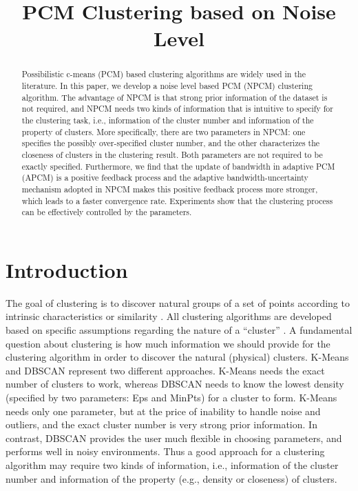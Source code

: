 \documentclass[conference]{IEEEtran}
\date{}
\title{PCM Clustering based on Noise Level}
\theoremstyle{definition}
\begin{document}
\author{
%
}
\maketitle
\begin{abstract}
Possibilistic c-means (PCM) based clustering algorithms are widely used in the literature. In this paper, we develop a noise level based PCM (NPCM) clustering algorithm.
The advantage of NPCM is that strong prior information of the dataset is not required, and NPCM needs two kinds of information that is intuitive to specify for the clustering task, i.e., information of the cluster number and information of the property of clusters. More specifically, there are two parameters in NPCM: one specifies the possibly over-specified cluster number, and the other characterizes the closeness of clusters in the clustering result. Both parameters are not required to be exactly specified. Furthermore, we find that the update of bandwidth in adaptive PCM (APCM) is a positive feedback process and the adaptive bandwidth-uncertainty mechanism adopted in NPCM makes this positive feedback process more stronger, which leads to a faster convergence rate.
Experiments show that the clustering process can be effectively controlled by the parameters.
\end{abstract}
\section{Introduction}
\label{sec-1}
The goal of clustering is to discover natural groups of a set of points according to intrinsic characteristics or similarity \cite{jain_data_2010}. All clustering algorithms are developed based on specific assumptions regarding the nature of a “cluster” \cite{jordan_machine_2015}.
A fundamental question about clustering is how much information we should provide for the clustering algorithm in order to discover the natural (physical) clusters.
K-Means \cite{jain_data_2010} and DBSCAN \cite{ester_density-based_1996} represent two different approaches. K-Means needs the exact number of clusters to work, whereas DBSCAN needs to know the lowest density (specified by two parameters: Eps and MinPts) for a cluster to form. K-Means needs only one parameter, but at the price of inability to handle noise and outliers, and the exact cluster number is very strong prior information. In contrast, DBSCAN provides the user much flexible in choosing parameters, and performs well in noisy environments.
Thus a good approach for a clustering algorithm may require two kinds of information, i.e., information of the cluster number and information of the property (e.g., density or closeness) of clusters.
\end{document}
